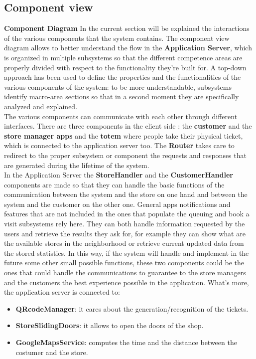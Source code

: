 \documentclass[]{article}
\begin{document}
	\subsection{Component view}
	\textbf{} \newline
	\textbf{Component Diagram} \newline
	In the current section will be explained the interactions of the various components that the system contains. The component view diagram allows to better understand the flow in the \textbf{Application Server}, which is organized in multiple subsystems so that the different competence areas are properly divided with respect to the functionality they’re built for. A top-down approach has been used to define the properties and the functionalities of the various components of the system: to be more understandable, subsystems identify macro-area sections so that in a second moment they are specifically analyzed and explained.\\
The various components can communicate with each other through different interfaces. 
There are three components in the client side : the \textbf{customer} and the \textbf{store manager apps} and the \textbf{totem} where people take their physical ticket, which is connected to the application server too. The \textbf{Router} takes care to redirect to the proper subsystem or component the requests and responses that are generated during the lifetime of the system.\\
In the Application Server the \textbf{StoreHandler} and the \textbf{CustomerHandler} components are made so that they can handle the basic functions of the communication between the system and the store on one hand and between the system and the customer on the other one. General apps notifications and features that are not included in the ones that populate the queuing and book a visit subsystems rely here. They can both handle information requested by the users and retrieve the results they ask for, for example they can show what are the available stores in the neighborhood or retrieve current updated data from the stored statistics. In this way, if the system will handle and implement in the future some other small possible functions, these two components could be the ones that could handle the communications to guarantee to the store managers and the customers the best experience possible in the application.\newline\newline
What’s more, the application server is connected to:\\
	\begin{itemize}
		\item 	\textbf{QRcodeManager}: it cares about the generation/recognition of the tickets.
		
		\item 	\textbf{StoreSlidingDoors}: it allows to open the doors of the shop.
		
		\item 	\textbf{GoogleMapsService}: computes the time and the distance between the costumer and the store.	
	
	\end{itemize}
	
\end{document}
